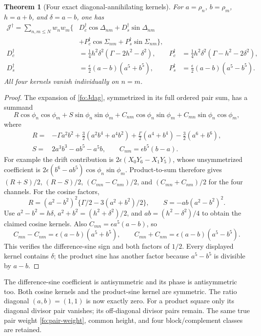 \documentclass[11pt]{article}
\numberwithin{equation}{section}
\newtheorem{theorem}{Theorem}[section]
\theoremstyle{definition}
\theoremstyle{remark}
\begin{document}
\begin{theorem}[Four exact diagonal-annihilating kernels]
\label{fo:Jdag-kernels}
For $a=\rho_n$, $b=\rho_m$, $h=a+b$, and $\delta=a-b$, one has
\begin{align}
\mathcal J^\dagger=\sum_{n,m\le N}w_nw_m\{&
D_c^\dagger\cos\Delta_{nm}+D_s^\dagger\sin\Delta_{nm}\nonumber\\
&+P_c^\dagger\cos\Sigma_{nm}+P_s^\dagger\sin\Sigma_{nm}\},
 \label{fo:Jdag-pairs}\\
D_c^\dagger&=\frac14h^2\delta^2(\Gamma-2h^2-\delta^2),
 &P_c^\dagger&=\frac14h^2\delta^2(\Gamma-h^2-2\delta^2),\nonumber\\
D_s^\dagger&=\frac\epsilon2(a-b)(a^5+b^5),
 &P_s^\dagger&=\frac\epsilon2(a-b)(a^5-b^5).\nonumber
\end{align}
All four kernels vanish individually on $n=m$.
\end{theorem}
\begin{proof}
The expansion of \eqref{fo:Jdag}, symmetrized in its full ordered
pair sum, has a summand
\begin{equation}
R\cos\phi_n\cos\phi_m+S\sin\phi_n\sin\phi_m
 +C_{nm}\cos\phi_n\sin\phi_m+C_{mn}\sin\phi_n\cos\phi_m,
\end{equation}
where
\begin{align}
R={}&-\Gamma a^2b^2+\frac32(a^2b^4+a^4b^2)
       +\frac\Gamma2(a^4+b^4)-\frac32(a^6+b^6),\nonumber\\
S={}&2a^3b^3-ab^5-a^5b,\qquad
C_{nm}=\epsilon b^5(b-a).\label{fo:Jdag-RSC}
\end{align}
For example the drift contribution is
$2\epsilon(X_0Y_6-X_1Y_5)$, whose unsymmetrized coefficient is
$2\epsilon(b^6-ab^5)\cos\phi_n\sin\phi_m$.
Product-to-sum therefore gives $(R+S)/2$, $(R-S)/2$,
$(C_{mn}-C_{nm})/2$, and $(C_{mn}+C_{nm})/2$ for the four
channels.  For the cosine factors,
\begin{equation}
R=(a^2-b^2)^2\{\Gamma/2-3(a^2+b^2)/2\},\qquad
S=-ab(a^2-b^2)^2.
\end{equation}
Use $a^2-b^2=h\delta$, $a^2+b^2=(h^2+\delta^2)/2$, and
$ab=(h^2-\delta^2)/4$ to obtain the claimed cosine kernels.
Also $C_{mn}=\epsilon a^5(a-b)$, so
\begin{equation}
C_{mn}-C_{nm}=\epsilon(a-b)(a^5+b^5),\qquad
C_{mn}+C_{nm}=\epsilon(a-b)(a^5-b^5).
\end{equation}
This verifies the difference-sine sign and both factors of $1/2$.
Every displayed kernel contains $\delta$; the product sine has
another factor because $a^5-b^5$ is divisible by $a-b$.
\end{proof}
The difference-sine coefficient is antisymmetric and its phase is
antisymmetric too.  Both cosine kernels and the product-sine kernel
are symmetric.  The ratio diagonal $(a,b)=(1,1)$ is now exactly zero.
For a product square only its diagonal divisor pair vanishes; its
off-diagonal divisor pairs remain.  The same true pair weight
\eqref{fo:pair-weight}, common height, and four block/complement classes
are retained.
\end{document}
